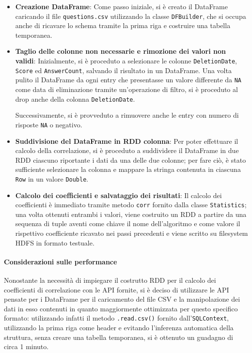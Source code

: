   \begin{itemize}
    \item
      \textbf{Creazione DataFrame}:
      Come passo iniziale, si è creato il DataFrame caricando il file \texttt{questions.csv} utilizzando la
      classe \texttt{DFBuilder}, che si occupa anche di ricavare lo schema tramite la prima riga e costruire una tabella temporanea.

    \item
      \textbf{Taglio delle colonne non necessarie e rimozione dei valori non validi}:
      Inizialmente, si è proceduto a selezionare le colonne \texttt{DeletionDate}, \texttt{Score} ed \texttt{AnswerCount}, salvando il risultato in un DataFrame.
      Una volta pulito il DataFrame da ogni entry che presentasse un valore differente da \texttt{NA} come data di eliminazione tramite un'operazione di filtro,
      si è proceduto al drop anche della colonna \texttt{DeletionDate}.

      Successivamente, si è provveduto a rimuovere anche le entry con numero di risposte \texttt{NA} o negativo.

    \item
      \textbf{Suddivisione del DataFrame in RDD colonna}:
      Per poter effettuare il calcolo della correlazione, si è proceduto a suddividere il DataFrame in due RDD ciascuno riportante i dati da una delle due colonne;
      per fare ciò, è stato sufficiente selezionare la colonna e mappare la stringa contenuta in ciascuna \texttt{Row} in un valore \texttt{Double}.

    \item
      \textbf{Calcolo dei coefficienti e salvataggio dei risultati}:
      Il calcolo dei coefficienti è immediato tramite metodo \texttt{corr} fornito dalla classe \texttt{Statistics};
      una volta ottenuti entrambi i valori, viene costruito un RDD a partire da una sequenza di tuple
      aventi come chiave il nome dell'algoritmo e come valore il rispettivo coefficiente ricavato nei passi precedenti
      e viene scritto su filesystem HDFS in formato testuale.
  \end{itemize}

  \paragraph{Considerazioni sulle performance}\label{par:job3:performance}

  Nonostante la necessità di impiegare il costrutto RDD per il calcolo dei coefficienti di correlazione con le API fornite,
  si è deciso di utilizzare le API pensate per i DataFrame per il caricamento del file CSV e la manipolazione dei dati in esso contenuti
  in quanto maggiormente ottimizzata per questo specifico formato:
  utilizzando infatti il metodo \texttt{.read.csv()} fornito dall'\texttt{SQLContext}, utilizzando la prima riga come header e evitando l'inferenza automatica della struttura, senza creare una tabella temporanea,
  si è ottenuto un guadagno di circa 1 minuto.

